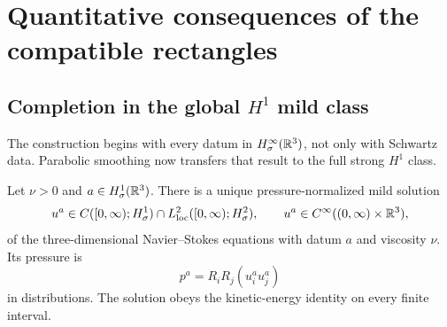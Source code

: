 \section{Quantitative consequences of the compatible rectangles}
\label{sec:quantitative-consequences}

\subsection[Completion in the global H1 mild class]
{Completion in the global \(H^1\) mild class}

The construction begins with every datum in
\(H^\infty_\sigma(\mathbb R^3)\), not only with Schwartz data.  Parabolic smoothing
now transfers that result to the full strong \(H^1\) class.

\begin{theorem}
\label{thm:qc-global-H1-completion}
Let \(\nu>0\) and \(a\in H^1_\sigma(\mathbb R^3)\).  There is a unique
pressure-normalized mild solution
\begin{equation}
 u^a\in C([0,\infty);H^1_\sigma)
 \cap L^2_{\rm loc}([0,\infty);H^2_\sigma),
 \qquad
 u^a\in C^\infty((0,\infty)\times\mathbb R^3),
 \label{eq:qc-global-H1-class}
\end{equation}
of the three-dimensional Navier--Stokes equations with datum \(a\) and
viscosity \(\nu\).  Its pressure is
\[
 p^a=R_iR_j(u_i^a u_j^a)
\]
in distributions.  The solution obeys the kinetic-energy identity on every
finite interval.
\end{theorem}

